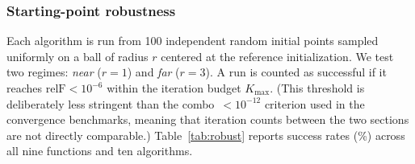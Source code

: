 \documentclass[review,onefignum,onetabnum]{siamart171218}
\begin{document}
	\subsubsection{Starting-point robustness}
	
	Each algorithm is run from 100 independent random initial points
	sampled uniformly on a ball of radius $r$ centered at the reference
	initialization.
	We test two regimes: \textit{near} ($r{=}1$) and \textit{far}
	($r{=}3$).
	A run is counted as successful if it reaches $\mathrm{relF}<10^{-6}$
	within the iteration budget $K_{\max}$.
	(This threshold is deliberately less stringent than the combo~$<10^{-12}$
	criterion used in the convergence benchmarks, meaning that iteration counts
	between the two sections are not directly comparable.)
	Table~\ref{tab:robust} reports
	success rates (\%) across all nine functions and ten algorithms.
	
\end{document}
